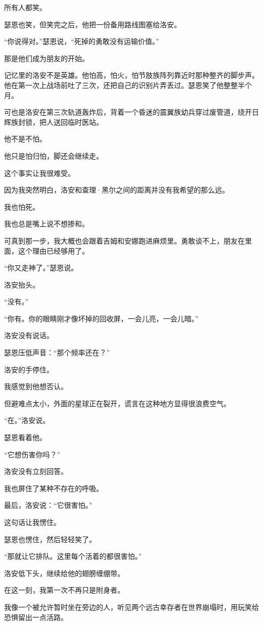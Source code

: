 所有人都笑。

瑟恩也笑，但笑完之后，他把一份备用路线图塞给洛安。

“你说得对。”瑟恩说，“死掉的勇敢没有运输价值。”

那是他们成为朋友的开始。

记忆里的洛安不是英雄。他怕高，怕火，怕节肢族阵列靠近时那种整齐的脚步声。他在第一次上战场前吐了三次，还把自己的识别片弄丢过。瑟恩笑了他整整半个月。

可也是洛安在第三次轨道轰炸后，背着一个昏迷的震翼族幼兵穿过废管道，绕开日辉族封锁，把人送回临时医站。

他不是不怕。

他只是怕归怕，脚还会继续走。

这个事实让我很难受。

因为我突然明白，洛安和查理·黑尔之间的距离并没有我希望的那么远。

我也怕死。

我也总是嘴上说不想掺和。

可真到那一步，我大概也会跟着吉姆和安娜跑进麻烦里。勇敢谈不上，朋友在里面，这个理由已经够用了。

“你又走神了。”瑟恩说。

洛安抬头。

“没有。”

“你有。你的眼睛刚才像坏掉的回收屏，一会儿亮，一会儿暗。”

洛安没有说话。

瑟恩压低声音：“那个频率还在？”

洛安的手停住。

我感觉到他想否认。

但避难点太小，外面的星球正在裂开，谎言在这种地方显得很浪费空气。

“在。”洛安说。

瑟恩看着他。

“它想伤害你吗？”

洛安没有立刻回答。

我也屏住了某种不存在的呼吸。

最后，洛安说：“它很害怕。”

这句话让我愣住。

瑟恩也愣住，然后轻轻笑了。

“那就让它排队。这里每个活着的都很害怕。”

洛安低下头，继续给他的翅膀缠绷带。

在这一刻，我第一次不再只是附身者。

我像一个被允许暂时坐在旁边的人，听见两个远古幸存者在世界崩塌时，用玩笑给恐惧留出一点活路。

